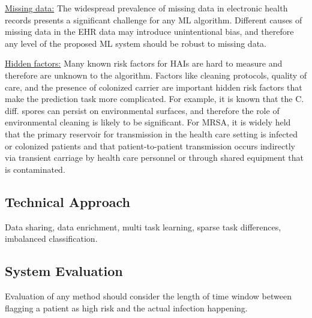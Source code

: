 \underline{Missing data:}  The widespread prevalence of missing data in electronic health records presents a significant challenge for any ML algorithm. Different causes of missing data in the EHR data may introduce unintentional bias, and therefore any level of the proposed ML system should be robust to missing data. 

\underline{Hidden factors:} Many known risk factors for HAIs are hard to measure and therefore are unknown to the algorithm. Factors like cleaning protocols, quality of care, and the presence of colonized carrier are important hidden risk factors that make the prediction task more complicated.  For example, it is known that the C. diff. spores can persist on environmental surfaces, and therefore the role of environmental cleaning is likely to be significant. For MRSA, it is widely held that the primary reservoir for transmission in the health care setting is infected or colonized patients and that patient-to-patient transmission occurs indirectly via transient carriage by health care personnel or through shared equipment that is contaminated. 





\subsection{Technical Approach}
Data sharing, data enrichment, multi task learning, sparse task differences, imbalanced classification. 

\subsection{System Evaluation}
Evaluation of any method should consider the length of time window between flagging a patient as high risk and the actual infection happening. 

